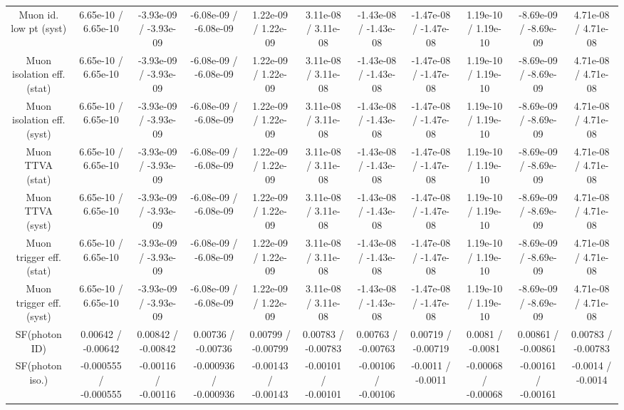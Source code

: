 \begin{table}[htbp]
\begin{center}
\begin{tabular}{|c|c|c|c|c|c|c|c|c|c|c|}
  Muon id. low pt (syst) & 6.65e-10 / 6.65e-10 & -3.93e-09 / -3.93e-09 & -6.08e-09 / -6.08e-09 & 1.22e-09 / 1.22e-09 & 3.11e-08 / 3.11e-08 & -1.43e-08 / -1.43e-08 & -1.47e-08 / -1.47e-08 & 1.19e-10 / 1.19e-10 & -8.69e-09 / -8.69e-09 & 4.71e-08 / 4.71e-08 \\ 
  Muon isolation eff. (stat) & 6.65e-10 / 6.65e-10 & -3.93e-09 / -3.93e-09 & -6.08e-09 / -6.08e-09 & 1.22e-09 / 1.22e-09 & 3.11e-08 / 3.11e-08 & -1.43e-08 / -1.43e-08 & -1.47e-08 / -1.47e-08 & 1.19e-10 / 1.19e-10 & -8.69e-09 / -8.69e-09 & 4.71e-08 / 4.71e-08 \\ 
  Muon isolation eff. (syst) & 6.65e-10 / 6.65e-10 & -3.93e-09 / -3.93e-09 & -6.08e-09 / -6.08e-09 & 1.22e-09 / 1.22e-09 & 3.11e-08 / 3.11e-08 & -1.43e-08 / -1.43e-08 & -1.47e-08 / -1.47e-08 & 1.19e-10 / 1.19e-10 & -8.69e-09 / -8.69e-09 & 4.71e-08 / 4.71e-08 \\ 
  Muon TTVA (stat) & 6.65e-10 / 6.65e-10 & -3.93e-09 / -3.93e-09 & -6.08e-09 / -6.08e-09 & 1.22e-09 / 1.22e-09 & 3.11e-08 / 3.11e-08 & -1.43e-08 / -1.43e-08 & -1.47e-08 / -1.47e-08 & 1.19e-10 / 1.19e-10 & -8.69e-09 / -8.69e-09 & 4.71e-08 / 4.71e-08 \\ 
  Muon TTVA (syst) & 6.65e-10 / 6.65e-10 & -3.93e-09 / -3.93e-09 & -6.08e-09 / -6.08e-09 & 1.22e-09 / 1.22e-09 & 3.11e-08 / 3.11e-08 & -1.43e-08 / -1.43e-08 & -1.47e-08 / -1.47e-08 & 1.19e-10 / 1.19e-10 & -8.69e-09 / -8.69e-09 & 4.71e-08 / 4.71e-08 \\ 
  Muon trigger eff. (stat) & 6.65e-10 / 6.65e-10 & -3.93e-09 / -3.93e-09 & -6.08e-09 / -6.08e-09 & 1.22e-09 / 1.22e-09 & 3.11e-08 / 3.11e-08 & -1.43e-08 / -1.43e-08 & -1.47e-08 / -1.47e-08 & 1.19e-10 / 1.19e-10 & -8.69e-09 / -8.69e-09 & 4.71e-08 / 4.71e-08 \\ 
  Muon trigger eff. (syst) & 6.65e-10 / 6.65e-10 & -3.93e-09 / -3.93e-09 & -6.08e-09 / -6.08e-09 & 1.22e-09 / 1.22e-09 & 3.11e-08 / 3.11e-08 & -1.43e-08 / -1.43e-08 & -1.47e-08 / -1.47e-08 & 1.19e-10 / 1.19e-10 & -8.69e-09 / -8.69e-09 & 4.71e-08 / 4.71e-08 \\ 
  SF(photon ID) & 0.00642 / -0.00642 & 0.00842 / -0.00842 & 0.00736 / -0.00736 & 0.00799 / -0.00799 & 0.00783 / -0.00783 & 0.00763 / -0.00763 & 0.00719 / -0.00719 & 0.0081 / -0.0081 & 0.00861 / -0.00861 & 0.00783 / -0.00783 \\ 
  SF(photon iso.) & -0.000555 / -0.000555 & -0.00116 / -0.00116 & -0.000936 / -0.000936 & -0.00143 / -0.00143 & -0.00101 / -0.00101 & -0.00106 / -0.00106 & -0.0011 / -0.0011 & -0.00068 / -0.00068 & -0.00161 / -0.00161 & -0.0014 / -0.0014 \\ 

\end{tabular}
\end{center}
\end{table}
